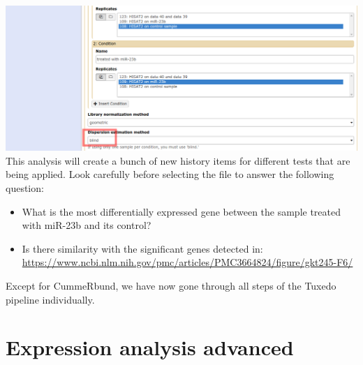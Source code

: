 \documentclass[11pt,a4paper]{article}
\begin{document}
\includegraphics[width=\textwidth]{figures/basic_04b.png}\\
This analysis will create a bunch of new history items for different tests that are being applied. Look carefully before selecting the file to answer the following question:
\begin{itemize}
	\item What is the most differentially expressed gene between the sample treated with miR-23b and its control?
	\item Is there similarity with the significant genes detected in:\\\url{https://www.ncbi.nlm.nih.gov/pmc/articles/PMC3664824/figure/gkt245-F6/}
\end{itemize}
Except for CummeRbund, we have now gone through all steps of the Tuxedo pipeline individually.

\section{Expression analysis advanced}
\end{document}
